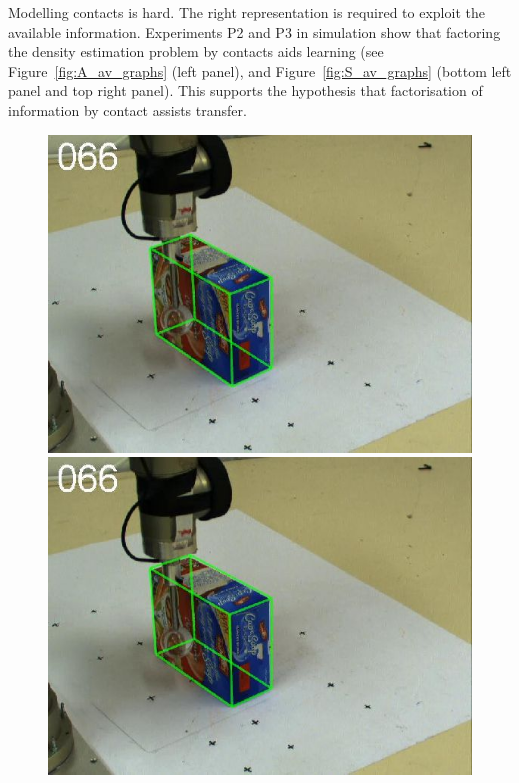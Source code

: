  Modelling contacts is hard. The right representation is required to exploit the available information. Experiments P2 and P3 in simulation show that factoring the density estimation problem by contacts aids learning (see Figure~\ref{fig:A_av_graphs} (left panel), and Figure~\ref{fig:S_av_graphs} (bottom left panel and top right panel). This supports the hypothesis that factorisation of information by contact assists transfer. 
\newlength{\imgCXwid}
\setlength{\imgCXwid}{2.15cm}
\begin{figure}[tbp]
\centerline{
\includegraphics[width=\imgCXwid]{images/C1_2exp_87_1}
\includegraphics[width=\imgCXwid]{images/C1_1exp_87_1}
}
\end{figure}
